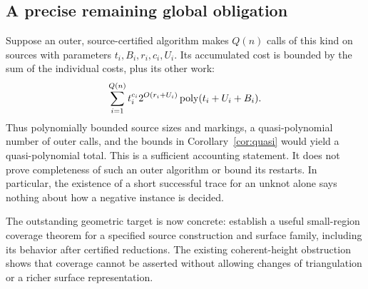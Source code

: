 \subsection{A precise remaining global obligation}

Suppose an outer, source-certified algorithm makes $Q(n)$ calls of this
kind on sources with parameters $t_i,B_i,r_i,c_i,U_i$. Its accumulated cost
is bounded by the sum of the individual costs, plus its other work:
\begin{equation}\label{eq:outer-sum}
 \sum_{i=1}^{Q(n)}t_i^{c_i}2^{O(r_i+U_i)}\operatorname{poly}(t_i+U_i+B_i).
\end{equation}
Thus polynomially bounded source sizes and markings, a quasi-polynomial
number of outer calls, and the bounds in Corollary~\ref{cor:quasi} would
yield a quasi-polynomial total. This is a sufficient accounting statement.
It does not prove completeness of such an outer algorithm or bound its
restarts. In particular, the existence of a short successful trace for an
unknot alone says nothing about how a negative instance is decided.

The outstanding geometric target is now concrete: establish a useful
small-region coverage theorem for a specified source construction and
surface family, including its behavior after certified reductions. The
existing coherent-height obstruction shows that coverage cannot be asserted
without allowing changes of triangulation or a richer surface representation.
